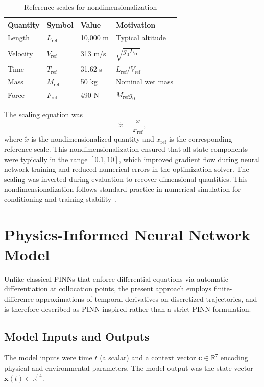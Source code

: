 \begin{table}[h]
\centering
\caption{Reference scales for nondimensionalization}
\label{tab:reference-scales-mm}
\begin{tabular}{llll}
\toprule
Quantity & Symbol & Value & Motivation \\
\midrule
Length & \(L_\mathrm{ref}\) & 10,000 m & Typical altitude \\
Velocity & \(V_\mathrm{ref}\) & 313 m/s & \(\sqrt{g_0 L_\mathrm{ref}}\) \\
Time & \(T_\mathrm{ref}\) & 31.62 s & \(L_\mathrm{ref}/V_\mathrm{ref}\) \\
Mass & \(M_\mathrm{ref}\) & 50 kg & Nominal wet mass \\
Force & \(F_\mathrm{ref}\) & 490 N & \(M_\mathrm{ref} g_0\) \\
\bottomrule
\end{tabular}
\end{table}

The scaling equation was
\[
  \tilde{x} = \frac{x}{x_\mathrm{ref}},
\]
where \(\tilde{x}\) is the nondimensionalized quantity and \(x_\mathrm{ref}\) is the
corresponding reference scale. This nondimensionalization ensured that all state
components were typically in the range \([0.1, 10]\), which improved gradient
flow during neural network training and reduced numerical errors in the
optimization solver. The scaling was inverted during evaluation to recover
dimensional quantities. This nondimensionalization follows standard practice 
in numerical simulation for conditioning and training stability~\cite{anderson1995}.

\section{Physics-Informed Neural Network Model}

Unlike classical PINNs that enforce differential equations via automatic differentiation 
at collocation points, the present approach employs finite-difference approximations of 
temporal derivatives on discretized trajectories, and is therefore described as PINN-inspired 
rather than a strict PINN formulation.

\subsection{Model Inputs and Outputs}

The model inputs were time \(t\) (a scalar) and a context vector
\(\mathbf{c} \in \mathbb{R}^7\) encoding physical and environmental parameters.
The model output was the state vector \(\mathbf{x}(t) \in \mathbb{R}^{14}\).


